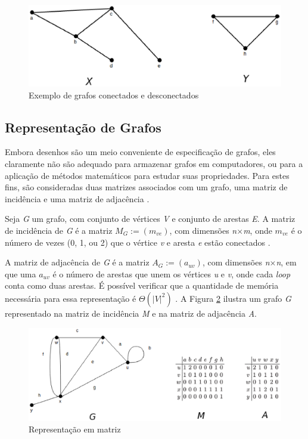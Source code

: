 \begin{figure}[!h]
	\centering
	\includegraphics[scale=0.5]{figuras/capitulo1/desconectados.eps}
	\caption{Exemplo de grafos conectados e desconectados}
	\label{desconectados}
\end{figure}

\subsection{Representação de Grafos}

Embora desenhos são um meio conveniente de especificação de grafos, eles claramente não são adequado para armazenar grafos em computadores, ou para a aplicação de métodos matemáticos para estudar suas propriedades. Para estes fins, são consideradas duas matrizes associados com um grafo, uma matriz de incidência e uma matriz de adjacência \cite{Bondy:2007}.

Seja \textit{G} um grafo, com conjunto de vértices \textit{V} e conjunto de arestas \textit{E}. A matriz de incidência de \textit{G} é a matriz $M_G:= (m_{ve})$, com dimensões \textit{n$\times$m}, onde $m_{ve}$ é o número de vezes (0, 1, ou 2) que o vértice \textit{v} e aresta \textit{e} estão conectados \cite{Bondy:2007}.

A matriz de adjacência de \textit{G} é a matriz $A_G := (a_{uv})$, com dimensões \textit{n$\times$n}, em que uma $a_{uv}$ é o número de arestas que unem os vértices \textit{u} e \textit{v}, onde cada \textit{loop} conta como duas arestas. É possível verificar que a quantidade de memória necessária para essa representação é $\Theta(|\textit{V}|^2)$ \cite{Bondy:2007}. A Figura \ref{matriz} ilustra um grafo \textit{G} representado na matriz de incidência \textit{M} e na matriz de adjacência \textit{A}.

\begin{figure}[!h]
	\centering
	\includegraphics[scale=0.65]{figuras/capitulo1/matriz.eps}
	\caption{Representação em matriz}
	\label{matriz}
\end{figure}

